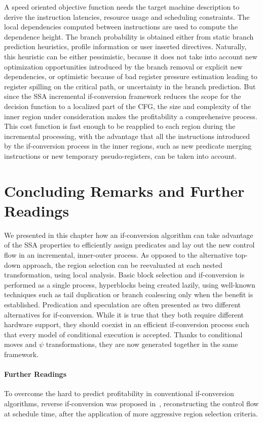 A speed oriented objective function needs the target machine description to derive the instruction latencies, resource usage and scheduling constraints. 
The local dependencies computed between instructions are used to compute the dependence height. 
The branch probability is obtained either from static branch prediction heuristics, profile information or user inserted directives. 
Naturally, this heuristic can be either pessimistic, because it does not take into account new optimization opportunities introduced by the branch removal or explicit new dependencies, or optimistic because of bad register pressure estimation leading to register spilling on the critical path, or uncertainty in the branch prediction. 
But since the SSA incremental if-conversion framework reduces the scope for the decision function to a localized part of the CFG, the size and complexity of the inner region under consideration makes the profitability a comprehensive process. 
This cost function is fast enough to be reapplied to each region during the incremental processing, with the advantage that all the instructions introduced by the if-conversion process in the inner regions, such as new predicate merging instructions or new temporary pseudo-registers, can be taken into account.

\section{Concluding Remarks and Further Readings} 
We presented in this chapter how an if-conversion algorithm can take advantage of the SSA properties to efficiently assign predicates and lay out the new control flow in an incremental, inner-outer process. 
As opposed to the alternative top-down approach, the region selection can be reevaluated at each nested transformation, using local analysis. 
Basic block selection and if-conversion is performed as a single process, hyperblocks being created lazily, using well-known techniques such as tail duplication or branch coalescing only when the benefit is established. 
Predication and speculation are often presented as two different alternatives for if-conversion. 
While it is true that they both require different hardware support, they should coexist in an efficient if-conversion process such that every model of conditional execution is accepted. 
Thanks to conditional moves and $\psi$ transformations, they are now generated together in the same framework.

\paragraph{Further Readings}
To overcome the hard to predict profitability in conventional if-conversion algorithms, reverse if-conversion was proposed in~\cite{August:1999:PRI:326224.325595}, reconstructing the control flow at schedule time, after the application of more aggressive region selection criteria.

